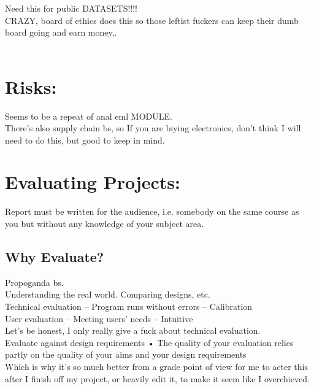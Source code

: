 \documentclass [12pt]{article}
\begin{document}
Need this for public DATASETS!!!!\\
CRAZY, board of ethics does this so those leftist fuckers can keep their dumb board going and earn money,.\\\ 

\section{Risks:}

Seems to be a repeat of anal eml MODULE.\\ 

There's also supply chain bs, so If you are biying electronics, don't think I will need to do this, but good to keep in mind.\\ 

\section{Evaluating Projects:}


Report must be written for the audience,
i.e. somebody on the same course as you
but without any knowledge of your
subject area.\\


\subsection{Why Evaluate?}
Propoganda bs.\\ 

Understanding the real world. Comparing designs, etc.\\ 

  Technical evaluation
– Program runs without errors
– Calibration\\


User evaluation
– Meeting users’ needs
– Intuitive\\

Let's be honest, I only really give a fuck about technical evaluation.\\ 

Evaluate against design requirements
• The quality of your evaluation relies
partly on the quality of your aims and
your design requirements\\

Which is why it's so much better from a grade point of view for me to acter this after I finish off my project, or heavily edit it, to make it seem like I overchieved.\\ 
\end{document}
